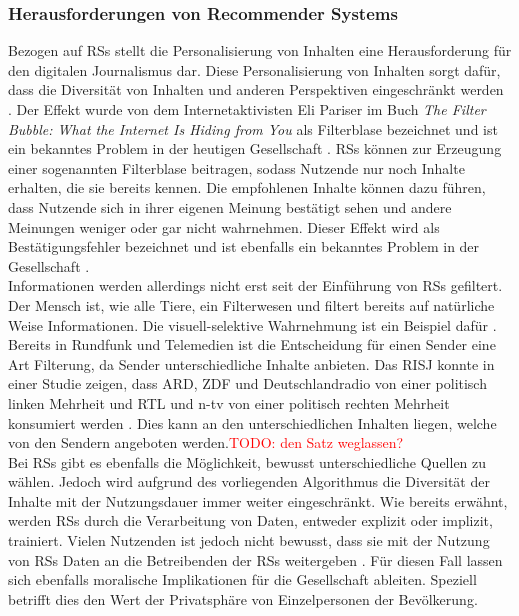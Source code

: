 \subsubsection{Herausforderungen von Recommender Systems}
Bezogen auf \acp{RS} stellt die Personalisierung von Inhalten eine Herausforderung für den digitalen Journalismus dar.
Diese Personalisierung von Inhalten sorgt dafür, dass die Diversität von Inhalten und anderen Perspektiven eingeschränkt werden \cite{rundfunk}.
Der Effekt wurde von dem Internetaktivisten Eli Pariser im Buch \textit{The Filter Bubble: What the Internet Is Hiding from You} als Filterblase bezeichnet und ist ein bekanntes Problem in der heutigen Gesellschaft \cite{filter-bubble}.
\acp{RS} können zur Erzeugung einer sogenannten Filterblase beitragen, sodass Nutzende nur noch Inhalte erhalten, die sie bereits kennen.
Die empfohlenen Inhalte können dazu führen, dass Nutzende sich in ihrer eigenen Meinung bestätigt sehen und andere Meinungen weniger oder gar nicht wahrnehmen.
Dieser Effekt wird als Bestätigungsfehler bezeichnet und ist ebenfalls ein bekanntes Problem in der Gesellschaft \cite{reasoning-rule}. \\

Informationen werden allerdings nicht erst seit der Einführung von \acp{RS} gefiltert.
Der Mensch ist, wie alle Tiere, ein \glqq Filterwesen\grqq{} und filtert bereits auf natürliche Weise Informationen.
Die visuell-selektive Wahrnehmung ist ein Beispiel dafür \cite{selective-perception}.
Bereits in Rundfunk und Telemedien ist die Entscheidung für einen Sender eine Art Filterung, da Sender unterschiedliche Inhalte anbieten.
Das \ac{RISJ} konnte in einer Studie zeigen, dass ARD, ZDF und Deutschlandradio von einer politisch linken Mehrheit und RTL und n-tv von einer politisch rechten Mehrheit konsumiert werden \cite{public-service-news}.
Dies kann an den unterschiedlichen Inhalten liegen, welche von den Sendern angeboten werden.\textcolor{red}{TODO: den Satz weglassen?} \\

Bei \acp{RS} gibt es ebenfalls die Möglichkeit, bewusst unterschiedliche Quellen zu wählen.
Jedoch wird aufgrund des vorliegenden Algorithmus die Diversität der Inhalte mit der Nutzungsdauer immer weiter eingeschränkt.
Wie bereits erwähnt, werden \acp{RS} durch die Verarbeitung von Daten, entweder explizit oder implizit, trainiert.
Vielen Nutzenden ist jedoch nicht bewusst, dass sie mit der Nutzung von \acp{RS} Daten an die Betreibenden der \acp{RS} weitergeben \cite{privacy-rs}.
Für diesen Fall lassen sich ebenfalls moralische Implikationen für die Gesellschaft ableiten.
Speziell betrifft dies den Wert der Privatsphäre von Einzelpersonen der Bevölkerung.\\

